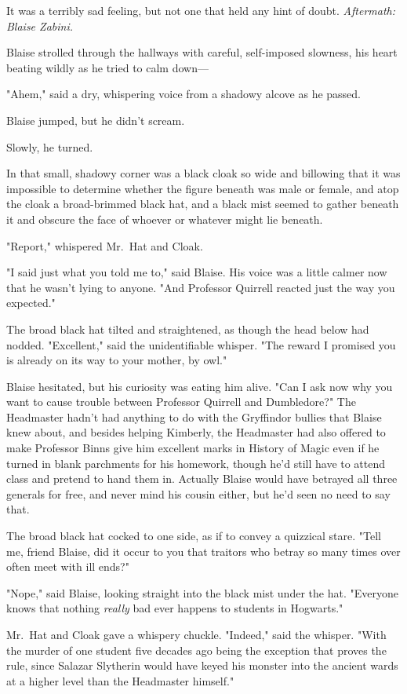 It was a terribly sad feeling, but not one that held any hint of doubt.
\sbreak
\emph{Aftermath: Blaise Zabini.}

Blaise strolled through the hallways with careful, self-imposed slowness, his 
heart beating wildly as he tried to calm down---

"Ahem," said a dry, whispering voice from a shadowy alcove as he passed.

Blaise jumped, but he didn't scream.

Slowly, he turned.

In that small, shadowy corner was a black cloak so wide and billowing that it 
was impossible to determine whether the figure beneath was male or female, and 
atop the cloak a broad-brimmed black hat, and a black mist seemed to gather 
beneath it and obscure the face of whoever or whatever might lie beneath.

"Report," whispered Mr.~Hat and Cloak.

"I said just what you told me to," said Blaise. His voice was a little calmer 
now that he wasn't lying to anyone. "And Professor Quirrell reacted just the 
way you expected."

The broad black hat tilted and straightened, as though the head below had 
nodded. "Excellent," said the unidentifiable whisper. "The reward I promised 
you is already on its way to your mother, by owl."

Blaise hesitated, but his curiosity was eating him alive. "Can I ask now why 
you want to cause trouble between Professor Quirrell and Dumbledore?" The 
Headmaster hadn't had anything to do with the Gryffindor bullies that Blaise 
knew about, and besides helping Kimberly, the Headmaster had also offered to 
make Professor Binns give him excellent marks in History of Magic even if he 
turned in blank parchments for his homework, though he'd still have to attend 
class and pretend to hand them in. Actually Blaise would have betrayed all 
three generals for free, and never mind his cousin either, but he'd seen no 
need to say that.

The broad black hat cocked to one side, as if to convey a quizzical stare. 
"Tell me, friend Blaise, did it occur to you that traitors who betray so many 
times over often meet with ill ends?"

"Nope," said Blaise, looking straight into the black mist under the hat. 
"Everyone knows that nothing \emph{really} bad ever happens to students in 
Hogwarts."

Mr.~Hat and Cloak gave a whispery chuckle. "Indeed," said the whisper. "With 
the murder of one student five decades ago being the exception that proves the 
rule, since Salazar Slytherin would have keyed his monster into the ancient 
wards at a higher level than the Headmaster himself."

